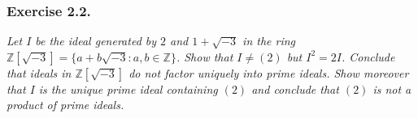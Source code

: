 \documentclass{article}
\begin{document}



\subsubsection*{Exercise 2.2.}
\emph{Let $I$ be the ideal generated by $2$ and $1 + \sqrt{-3}$ in the ring
$\mathbb{Z}[\sqrt{-3}] = \{ a+b\sqrt{-3} : a,b \in \mathbb{Z} \}$.
Show that $I \neq (2)$ but $I^2 = 2I$.
Conclude that ideals in $\mathbb{Z}[\sqrt{-3}]$ do not factor uniquely
into prime ideals.
Show moreover that $I$ is the unique prime ideal containing $(2)$
and conclude that $(2)$ is not a product of prime ideals.} \\
\end{document}
